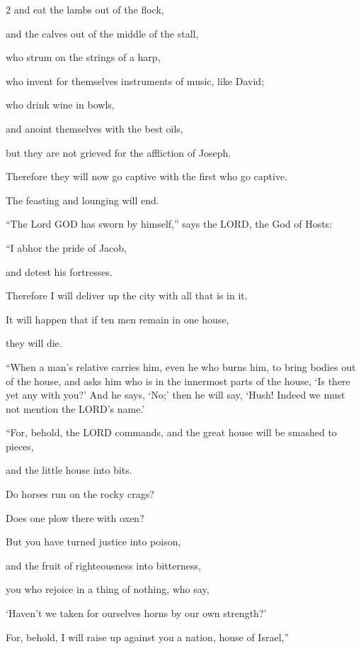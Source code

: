 \begin{multicols}{2}
	and eat the lambs out of the flock,
	
	and the calves out of the middle of the stall,
	
	\myverse{}who strum on the strings of a harp,
	
	who invent for themselves instruments of music, like David;
	
	\myverse{}who drink wine in bowls,
	
	and anoint themselves with the best oils,
	
	but they are not grieved for the affliction of Joseph.
	
	\myverse{}Therefore they will now go captive with the first who go captive.
	
	The feasting and lounging will end.
	
	\myverse{}“The Lord GOD has sworn by himself,” says the LORD, the God of
	Hosts:
	
	“I abhor the pride of Jacob,
	
	and detest his fortresses.
	
	Therefore I will deliver up the city with all that is in it.
	
	\myverse{}It will happen that if ten men remain in one house,
	
	they will die.
	
	\myverse{}“When a man’s relative carries him, even he who burns him, to
	bring bodies out of the house, and asks him who is in the innermost parts of the house, ‘Is there yet
	any with you?’ And he says, ‘No;’ then he will say, ‘Hush! Indeed we must not mention the LORD’s name.’
	
	
	\vspace{\baselineskip} \myverse{}“For, behold, the LORD commands, and the great house will be
	smashed to pieces,
	
	and the little house into bits.
	
	\myverse{}Do horses run on the rocky crags?
	
	Does one plow there with oxen?
	
	But you have turned justice into poison,
	
	and the fruit of righteousness into bitterness,
	
	\myverse{}you who rejoice in a thing of nothing, who say,
\end{multicols}

	‘Haven’t we taken for ourselves horns by our own strength?’
	
	\myverse{}For, behold, I will raise up against you a nation, house of
	Israel,”
	
